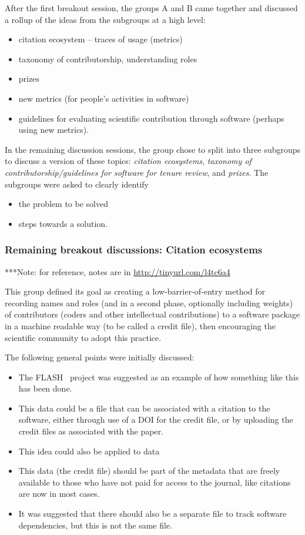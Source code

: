 \documentclass[11pt, oneside]{amsart}
\newcommand{\note}[1]{ {\textcolor{blueish}    { ***Note:      #1 }}}
\begin{document}
After the first breakout session, the groups A and B came together and discussed
a rollup of the ideas from the subgroups at a high level:
\begin{itemize}
\item citation ecosystem -- traces of usage (metrics)
\item taxonomy of contributorship, understanding roles
\item prizes
\item new metrics (for people's activities in software)
\item guidelines for evaluating scientific contribution through software (perhaps
using new metrics).
\end{itemize}

In the remaining discussion sessions, the group chose to split into three
subgroups to discuss a version of these topics: {\em citation ecosystems}, {\em
taxonomy of contributorship/guidelines for software for tenure review}, and {\em
prizes}. The subgroups were asked to clearly identify
\begin{itemize}
\item the problem to be solved
\item steps towards a solution.
\end{itemize}



\subsubsection{Remaining breakout discussions: Citation ecosystems}

\note{for reference, notes are in \url{http://tinyurl.com/l4tc6a4}}

This group defined its goal as creating a low-barrier-of-entry method for
recording names and roles (and in a second phase, optionally including weights)
of contributors (coders and other intellectual contributions) to a software
package in a machine readable way (to be called a credit file), then encouraging
the scientific community to adopt this practice.

The following general points were initially discussed:
\begin{itemize}
\item The FLASH~\cite{flash} project was suggested as an example of how something
like this has been done.
\item This data could be a file that can be associated with a citation to the
software, either through use of a DOI for the credit file, or by uploading the
credit files as associated with the paper.
\item This idea could also be applied to data
\item This data (the credit file) should be part of the metadata that are freely
available to those who have not paid for access to the journal, like citations are now in most cases.
\item It was suggested that there should also be a separate file to track
software dependencies, but this is not the same file.
\end{itemize}
\end{document}
